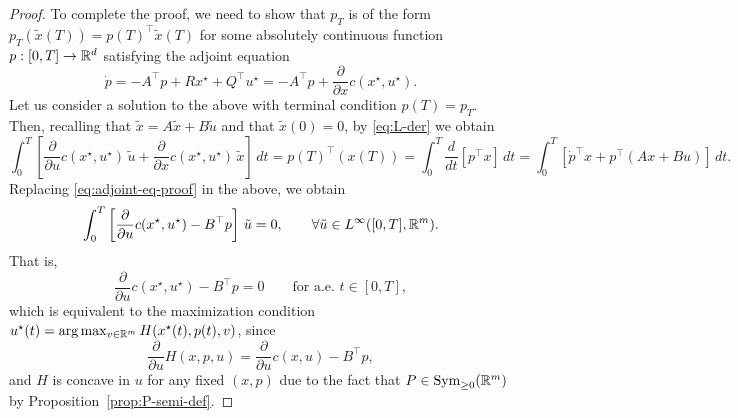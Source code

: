 \begin{proof}
    To complete the proof, we need to show that $p_T$ is of the form $p_T(\tilde x(T)) = p(T)^\top \tilde x(T)$ for some absolutely continuous function $p:[0,T]\to \mathbb{R}^d$ satisfying the adjoint equation 
    \begin{equation}
        \label{eq:adjoint-eq-proof}
        \dot p =-A^\top p + Rx^\star + Q^\top u^\star =  -A^\top p + \frac{\partial}{\partial x}c(x^\star, u^\star).
    \end{equation}
    Let us consider a solution to the above with terminal condition $p(T)=p_T$.
    Then, recalling that $\tilde x = A\tilde x + B \tilde u$ and that $\tilde x(0)=0$, by \eqref{eq:L-der} we obtain
    \begin{equation}
       \int_0^T \left[ \frac{\partial}{\partial u} c(x^\star, u^\star) \, \tilde u + \frac{\partial}{\partial x}c(x^\star, u^\star) \, \tilde x  \right] \, dt 
       = p(T)^\top (x(T)) 
       = \int_0^T \frac{d}{dt} \left[p^\top x\right]\, dt 
       = \int_0^T \left[ \dot p^\top x + p^\top (Ax + Bu) \right]\, dt.
    \end{equation}
    Replacing \eqref{eq:adjoint-eq-proof} in the above, we obtain 
    \begin{equation}
        \int_0^T \left[\frac{\partial}{\partial u} c(x^\star, u^\star) - B^\top p \right]\, \tilde u = 0, \qquad \forall \tilde u\in L^\infty([0,T],\mathbb{R}^m). 
    \end{equation} 
    That is, 
    \begin{equation}
       \frac{\partial}{\partial u} c(x^\star, u^\star) - B^\top p = 0 \qquad \text{for a.e.\ } t\in [0,T],  
    \end{equation}
    which is equivalent to the maximization condition $u^\star(t) = \arg\max_{v\in \mathbb{R}^m} H(x^\star(t),p(t),v)$, since
    \begin{equation}
        \frac{\partial}{\partial u} H(x,p,u) = \frac{\partial}{\partial u} c(x,u) - B^\top p,
    \end{equation}
    and $H$ is concave in $u$ for any fixed $(x,p)$ due to the fact that $P\in \operatorname{Sym}_{\ge0}(\mathbb{R}^m)$ by Proposition~\ref{prop:P-semi-def}.
\end{proof}


